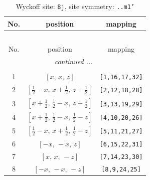 \documentclass[fleqn,8pt]{jsarticle}
\begin{document}
\begin{longtable}{ccc}
\caption{Wyckoff site: {\tt 8j}, site symmetry: {\tt ..m1'}}
 \\
 \hline \hline
No. & position & mapping \\ \hline \endfirsthead

\multicolumn{2}{l}{\tablename\ \thetable{}} \\
 \hline \hline
No. & position & mapping \\ \hline \endhead

 \hline \hline
\multicolumn{2}{r}{\footnotesize\it continued ...} \\ \endfoot

 \hline \hline
\multicolumn{2}{r}{} \\ \endlastfoot

1 & $\left[ x,\, x,\, z \right]$ & {\tt [1,16,17,32]} \\ \hline
2 & $\left[ \frac{1}{2} - x,\, x + \frac{1}{2},\, z + \frac{1}{2} \right]$ & {\tt [2,12,18,28]} \\ \hline
3 & $\left[ x + \frac{1}{2},\, \frac{1}{2} - x,\, z + \frac{1}{2} \right]$ & {\tt [3,13,19,29]} \\ \hline
4 & $\left[ x + \frac{1}{2},\, \frac{1}{2} - x,\, \frac{1}{2} - z \right]$ & {\tt [4,10,20,26]} \\ \hline
5 & $\left[ \frac{1}{2} - x,\, x + \frac{1}{2},\, \frac{1}{2} - z \right]$ & {\tt [5,11,21,27]} \\ \hline
6 & $\left[ - x,\, - x,\, z \right]$ & {\tt [6,15,22,31]} \\ \hline
7 & $\left[ x,\, x,\, - z \right]$ & {\tt [7,14,23,30]} \\ \hline
8 & $\left[ - x,\, - x,\, - z \right]$ & {\tt [8,9,24,25]} \\
\end{longtable}
\renewcommand{\arraystretch}{1.2}
\end{document}
